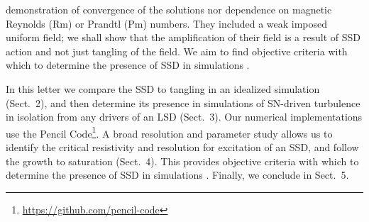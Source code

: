 \documentclass[preprint2]{aastex63}
\begin{document}
 demonstration of convergence of the solutions nor dependence on
 magnetic Reynolds (Rm) or Prandtl (Pm) numbers.
 They included a weak imposed uniform field; we shall show
 that the amplification of their field is a result
 of SSD action and not just tangling of the field.
 We aim to find objective criteria with which to determine the presence of SSD
 in simulations \citep[such as][]{Gent:2013b,GE20}.

In this letter we compare the SSD to tangling in
an idealized simulation (Sect.\ 2), and then
    determine its presence in
simulations of SN-driven 
turbulence in isolation from any drivers of an LSD (Sect.\ 3). 
Our numerical implementations use the {\sc Pencil Code}\footnote{
\href{https://github.com/pencil-code}{https://github.com/pencil-code}}.
A broad resolution and parameter study allows us to identify the critical
   resistivity and resolution for excitation of an SSD, and follow the
   growth to saturation (Sect.\ 4).
   This provides
objective criteria with which to determine the presence of SSD
in simulations \citep[such as][]{Gent:2013b,GE20,SBADMN19}.
Finally, we conclude in Sect.\ 5.
\end{document}
